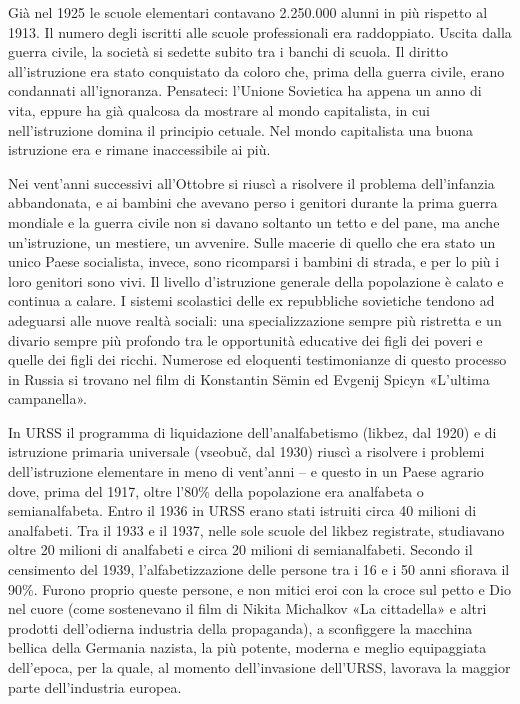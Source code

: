 \documentclass[12pt,a4paper,openany]{book}
\begin{document}
Già nel 1925 le scuole elementari contavano 2.250.000 alunni in più rispetto al 1913. Il numero degli iscritti alle scuole professionali era raddoppiato. Uscita dalla guerra civile, la società si sedette subito tra i banchi di scuola. Il diritto all'istruzione era stato conquistato da coloro che, prima della guerra civile, erano condannati all'ignoranza. Pensateci: l'Unione Sovietica ha appena un anno di vita, eppure ha già qualcosa da mostrare al mondo capitalista, in cui nell'istruzione domina il principio cetuale. Nel mondo capitalista una buona istruzione era e rimane inaccessibile ai più.

Nei vent'anni successivi all'Ottobre si riuscì a risolvere il problema dell'infanzia abbandonata, e ai bambini che avevano perso i genitori durante la prima guerra mondiale e la guerra civile non si davano soltanto un tetto e del pane, ma anche un'istruzione, un mestiere, un avvenire. Sulle macerie di quello che era stato un unico Paese socialista, invece, sono ricomparsi i bambini di strada, e per lo più i loro genitori sono vivi. Il livello d'istruzione generale della popolazione è calato e continua a calare. I sistemi scolastici delle ex repubbliche sovietiche tendono ad adeguarsi alle nuove realtà sociali: una specializzazione sempre più ristretta e un divario sempre più profondo tra le opportunità educative dei figli dei poveri e quelle dei figli dei ricchi. Numerose ed eloquenti testimonianze di questo processo in Russia si trovano nel film di Konstantin Sëmin ed Evgenij Spicyn «L'ultima campanella».

In URSS il programma di liquidazione dell'analfabetismo (likbez, dal 1920) e di istruzione primaria universale (vseobuč, dal 1930) riuscì a risolvere i problemi dell'istruzione elementare in meno di vent'anni – e questo in un Paese agrario dove, prima del 1917, oltre l'80\% della popolazione era analfabeta o semianalfabeta. Entro il 1936 in URSS erano stati istruiti circa 40 milioni di analfabeti. Tra il 1933 e il 1937, nelle sole scuole del likbez registrate, studiavano oltre 20 milioni di analfabeti e circa 20 milioni di semianalfabeti. Secondo il censimento del 1939, l'alfabetizzazione delle persone tra i 16 e i 50 anni sfiorava il 90\%. Furono proprio queste persone, e non mitici eroi con la croce sul petto e Dio nel cuore (come sostenevano il film di Nikita Michalkov «La cittadella» e altri prodotti dell'odierna industria della propaganda), a sconfiggere la macchina bellica della Germania nazista, la più potente, moderna e meglio equipaggiata dell'epoca, per la quale, al momento dell'invasione dell'URSS, lavorava la maggior parte dell'industria europea.
\end{document}
